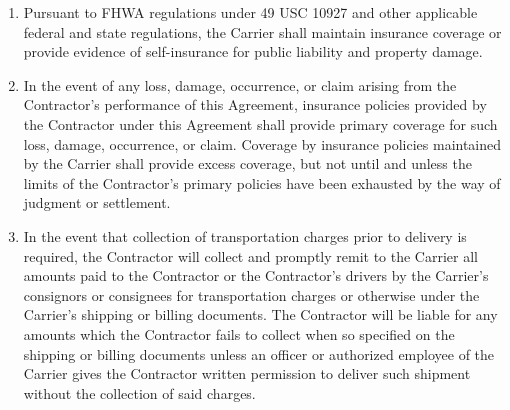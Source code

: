 \begin{enumerate}[
    ref = \SecondLevelEnumerator
]
\begin{enumerate}[
        ref = \ThirdLevelEnumerator
    ]
        \item The Contractor agrees to provide the Carrier written notice,
        within 24 hours, of cancellation or reduction of limits of
        insurance identified herein. Any such cancellation or reduction
        shall not affect the obligations of the Contractor to maintain such
        insurance.
    \end{enumerate}

    \item Pursuant to FHWA regulations under 49 USC 10927 and other
    applicable federal and state regulations, the Carrier shall maintain
    insurance coverage or provide evidence of self-insurance for public
    liability and property damage.

    \item In the event of any loss, damage, occurrence, or claim arising
    from the Contractor's performance of this Agreement, insurance policies
    provided by the Contractor under this Agreement shall provide primary
    coverage for such loss, damage, occurrence, or claim. Coverage by
    insurance policies maintained by the Carrier shall provide excess
    coverage, but not until and unless the limits of the Contractor's
    primary policies have been exhausted by the way of judgment or
    settlement.

    \item In the event that collection of transportation charges prior to
    delivery is required, the Contractor will collect and promptly remit to
    the Carrier all amounts paid to the Contractor or the Contractor's
    drivers by the Carrier's consignors or consignees for transportation
    charges or otherwise under the Carrier's shipping or billing documents.
    The Contractor will be liable for any amounts which the Contractor
    fails to collect when so specified on the shipping or billing documents
    unless an officer or authorized employee of the Carrier gives the
    Contractor written permission to deliver such shipment without the
    collection of said charges.
\end{enumerate}